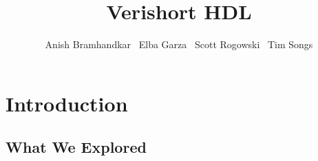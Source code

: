 

\title{Verishort HDL}
\author{Anish Bramhandkar \ Elba Garza \ Scott Rogowski \ Tim Songs}
\renewcommand{\today}{December 22, 2010}
\maketitle

\newpage

\tableofcontents

\newpage

\section{Introduction}
\subsection{What We Explored}

